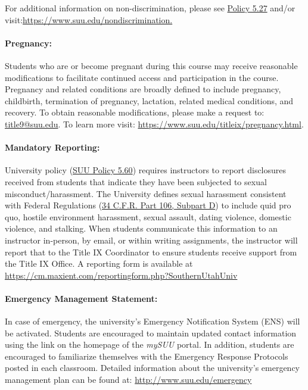 \documentclass[12pt, letterpaper]{article}
\begin{document}
\noindent
For additional information on non-discrimination, please see \href{https://www.suu.edu/policies/05/27.html}{Policy 5.27} and/or visit:\newline \href{https://www.suu.edu/nondiscrimination.}{https://www.suu.edu/nondiscrimination.}

\paragraph{Pregnancy:}
Students who are or become pregnant during this course may receive reasonable modifications to facilitate continued access and participation in the course. Pregnancy and related conditions are broadly defined to include pregnancy, childbirth, termination of pregnancy, lactation, related medical conditions, and recovery. To obtain reasonable modifications, please make a request to: \href{mailto:title9@suu.edu}{title9@suu.edu}. To learn more visit: \href{https://www.suu.edu/titleix/pregnancy.html}{https://www.suu.edu/titleix/pregnancy.html}.

\paragraph{Mandatory Reporting:}
University policy (\href{https://www.suu.edu/policies/05/60.html}{SUU Policy 5.60}) requires instructors to report disclosures received from students that indicate they have been subjected to sexual misconduct/harassment. The University defines sexual harassment consistent with Federal Regulations (\href{https://www.ecfr.gov/current/title-34/subtitle-B/chapter-I/part-106/subpart-D}{34 C.F.R. Part 106, Subpart D}) to include quid pro quo, hostile environment harassment, sexual assault, dating violence, domestic violence, and stalking. When students communicate this information to an instructor in-person, by email, or within writing assignments, the instructor will report that to the Title IX Coordinator to ensure students receive support from the Title IX Office. A reporting form is available at \href{https://cm.maxient.com/reportingform.php?SouthernUtahUniv}{https://cm.maxient.com/reportingform.php?SouthernUtahUniv}

\paragraph{Emergency Management Statement:}
In case of emergency, the university's Emergency Notification System (ENS) will be activated. Students are encouraged to maintain updated contact information using the link on the homepage of the \emph{mySUU} portal. In addition, students are encouraged to familiarize themselves with the Emergency Response Protocols posted in each classroom. Detailed information about the university's emergency management plan can be found at: \href{http://www.suu.edu/emergency}{http://www.suu.edu/emergency}
\end{document}
